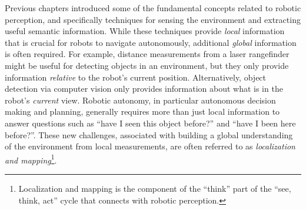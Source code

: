 Previous chapters introduced some of the fundamental concepts related to robotic perception, and specifically techniques for sensing the environment and extracting useful semantic information. While these techniques provide \textit{local} information that is crucial for robots to navigate autonomously, additional \textit{global} information is often required. 
For example, distance measurements from a laser rangefinder might be useful for detecting objects in an environment, but they only provide information \textit{relative} to the robot's current position. Alternatively, object detection via computer vision only provides information about what is in the robot's \textit{current} view. Robotic autonomy, in particular autonomous decision making and planning, generally requires more than just local information to answer questions such as ``have I seen this object before?'' and ``have I been here before?''.
These new challenges, associated with building a global understanding of the environment from local measurements, are often referred to as \textit{localization and mapping}\footnote{Localization and mapping is the component of the ``think'' part of the ``see, think, act'' cycle that connects with robotic perception.}.




